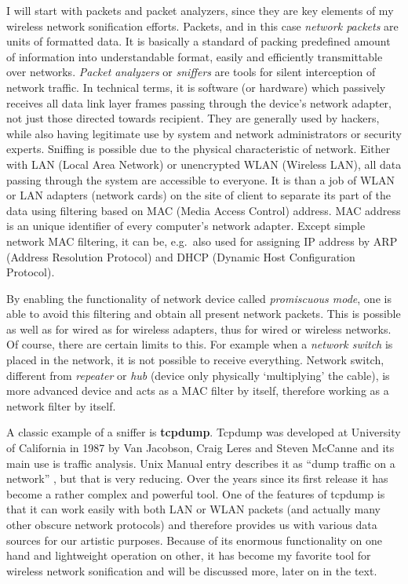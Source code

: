 \documentclass[12pt,a4paper,oneside]{report}
\begin{document}
I will start with packets and packet analyzers, since they are key elements of my wireless network sonification efforts. Packets, and in this case \emph{network packets} are units of formatted data. It is basically a standard of packing predefined amount of information into understandable format, easily and efficiently transmittable over networks. \emph{Packet analyzers} or \emph{sniffers} are tools for silent interception of network traffic. In technical terms, it is software (or hardware) which passively receives all data link layer frames passing through the device’s network adapter, not just those directed towards recipient. They are generally used by hackers, while also having legitimate use by system and network administrators or security experts. Sniffing is possible due to the physical characteristic of network. Either with LAN (Local Area Network) or unencrypted WLAN (Wireless LAN), all data passing through the system are accessible to everyone. It is than a job of WLAN or LAN adapters (network cards) on the site of client to separate its part of the data using filtering based on MAC (Media Access Control) address. MAC address is an unique identifier of every computer's network adapter. Except simple network MAC filtering, it can be, e.g.\, also used for assigning IP address by ARP (Address Resolution Protocol) and DHCP (Dynamic Host Configuration Protocol).

By enabling the functionality of network device called \emph{promiscuous mode}, one is able to avoid this filtering and obtain all present network packets. This is possible as well as for wired as for wireless adapters, thus for wired or wireless networks. Of course, there are certain limits to this. For example when a \emph{network switch} is placed in the network, it is not possible to receive everything. Network switch, different from \emph{repeater} or \emph{hub} (device only physically `multiplying' the cable), is more advanced device and acts as a MAC filter by itself, therefore working as a network filter by itself. \cite{Pallavi2012}

A classic example of a sniffer is \textbf{tcpdump}. Tcpdump was developed at University of California in 1987 by Van Jacobson, Craig Leres and Steven McCanne and its main use is traffic analysis. Unix Manual entry describes it as ``dump traffic on a network'' \cite{tcpdump}, but that is very reducing. Over the years since its first release it has become a rather complex and powerful tool. One of the features of tcpdump is that it can work easily with both LAN or WLAN packets (and actually many other obscure network protocols) and therefore provides us with various data sources for our artistic purposes. Because of its enormous functionality on one hand and lightweight operation on other, it has become my favorite tool for wireless network sonification and will be discussed more, later on in the text.
\end{document}

